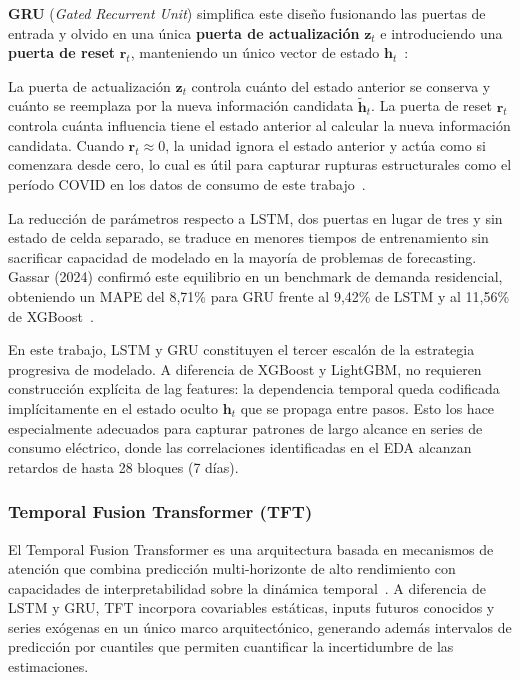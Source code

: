 \documentclass[12pt, a4paper]{article}
\begin{document}
\textbf{GRU} (\textit{Gated Recurrent Unit}) simplifica este diseño fusionando las puertas de entrada y olvido en una única \textbf{puerta de actualización} $\mathbf{z}_t$ e introduciendo una \textbf{puerta de reset} $\mathbf{r}_t$, manteniendo un único vector de estado $\mathbf{h}_t$~\cite{cho2014}:

La puerta de actualización $\mathbf{z}_t$ controla cuánto del estado anterior se conserva y cuánto se reemplaza por la nueva información candidata $\tilde{\mathbf{h}}_t$. La puerta de reset $\mathbf{r}_t$ controla cuánta influencia tiene el estado anterior al calcular la nueva información candidata. Cuando $\mathbf{r}_t \approx 0$, la unidad ignora el estado anterior y actúa como si comenzara desde cero, lo cual es útil para capturar rupturas estructurales como el período COVID en los datos de consumo de este trabajo~\cite{cho2014}.

La reducción de parámetros respecto a LSTM, dos puertas en lugar de tres y sin estado de celda separado, se traduce en menores tiempos de entrenamiento sin sacrificar capacidad de modelado en la mayoría de problemas de forecasting. Gassar (2024) confirmó este equilibrio en un benchmark de demanda residencial, obteniendo un MAPE del 8,71\% para GRU frente al 9,42\% de LSTM y al 11,56\% de XGBoost~\cite{gassar2024}.

En este trabajo, LSTM y GRU constituyen el tercer escalón de la estrategia progresiva de modelado. A diferencia de XGBoost y LightGBM, no requieren construcción explícita de lag features: la dependencia temporal queda codificada implícitamente en el estado oculto $\mathbf{h}_t$ que se propaga entre pasos. Esto los hace especialmente adecuados para capturar patrones de largo alcance en series de consumo eléctrico, donde las correlaciones identificadas en el EDA alcanzan retardos de hasta 28 bloques (7 días).

\subsubsection{Temporal Fusion Transformer (TFT)}


El Temporal Fusion Transformer es una arquitectura basada en mecanismos de atención que combina predicción multi-horizonte de alto rendimiento con capacidades de interpretabilidad sobre la dinámica temporal~\cite{lim2021}. A diferencia de LSTM y GRU, TFT incorpora covariables estáticas, inputs futuros conocidos y series exógenas en un único marco arquitectónico, generando además intervalos de predicción por cuantiles que permiten cuantificar la incertidumbre de las estimaciones.
\end{document}
